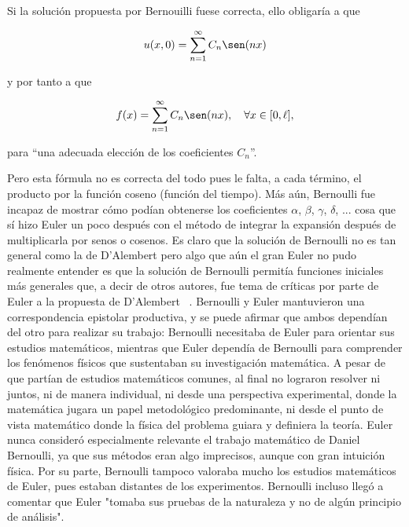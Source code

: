 Si la solución propuesta por Bernouilli fuese correcta, ello obligaría a que

\begin{equation}\label{eq10}
	u(x, 0) = \sum_{n=1}^{\infty} C_n \sen(nx)
\end{equation}

y por tanto a que

\begin{equation}\label{eq11}
f(x) = \sum_{n=1}^{\infty} C_n \sen(nx), \quad \forall x \in [0, \ell],
\end{equation}

para “una adecuada elección de los coeficientes \( C_n \)”. \newline


Pero esta fórmula no es correcta del todo pues le falta, a cada término, el producto por la función coseno (función del tiempo). Más aún, Bernoulli fue incapaz de mostrar cómo podían obtenerse los coeficientes \( \alpha \), \( \beta \), \( \gamma \), \( \delta \), ... cosa que sí hizo Euler un poco después con el método de integrar la expansión después de multiplicarla por senos o cosenos. Es claro que la solución de Bernoulli no es tan general como la de D’Alembert pero algo que aún el gran Euler no pudo realmente entender es que la solución de Bernoulli permitía funciones iniciales más generales que, a decir de otros autores, fue tema de críticas por parte de Euler a la propuesta de D’Alembert ~\cite{springer1999Physics}.
Bernoulli y Euler mantuvieron una correspondencia epistolar productiva, y se puede afirmar que ambos dependían del otro para realizar su trabajo: Bernoulli necesitaba de Euler para orientar sus estudios matemáticos, mientras que Euler dependía de Bernoulli para comprender los fenómenos físicos que sustentaban su investigación matemática. A pesar de que partían de estudios matemáticos comunes, al final no lograron resolver ni juntos, ni de manera individual, ni desde una perspectiva experimental, donde la matemática jugara un papel metodológico predominante, ni desde el punto de vista matemático donde la física del problema guiara y definiera la teoría. Euler nunca consideró especialmente relevante el trabajo matemático de Daniel Bernoulli, ya que sus métodos eran algo imprecisos, aunque con gran intuición física. Por su parte, Bernoulli tampoco valoraba mucho los estudios matemáticos de Euler, pues estaban distantes de los experimentos. Bernoulli incluso llegó a comentar que Euler "tomaba sus pruebas de la naturaleza y no de algún principio de análisis". ~\cite{springer1999Physics}


